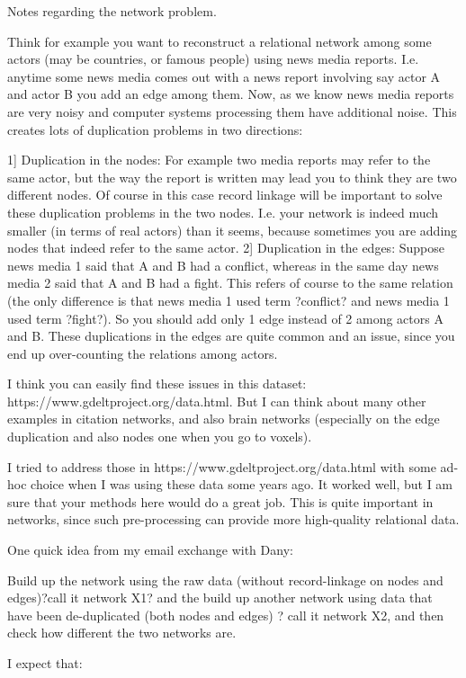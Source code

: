 \documentclass[twoside]{article}
\begin{document}
Notes regarding the network problem. 

Think for example you want to reconstruct a relational network among some actors (may be countries, or famous people) using news media reports.  I.e. anytime some news media comes out with a news report involving say actor A and actor B you add an edge among them. Now, as we know news media reports are very noisy and computer systems processing them have additional noise. This creates lots of duplication problems in two directions:

1] Duplication in the nodes: For example two media reports may refer to the same actor, but the way the report is written may lead you to think they are two different nodes. Of course in this case record linkage will be important to solve these duplication problems in the two nodes. I.e. your network is indeed much smaller (in terms of real actors) than it seems, because sometimes you are adding nodes that indeed refer to the same actor.
2] Duplication in the edges:  Suppose news media 1 said that A and B had a conflict, whereas in the same day news media 2 said that A and B had a fight. This refers of course to the same relation (the only difference is that news media 1 used term ?conflict? and news media 1 used term ?fight?). So you should add only 1 edge instead of 2 among actors A and B. These duplications in the edges are quite common and an issue, since you end up over-counting the relations among actors.

I think you can easily find these issues in this dataset: https://www.gdeltproject.org/data.html. But I can think about many other examples in citation networks, and also brain networks (especially on the edge duplication and also nodes one when you go to voxels).

I tried to address those in  https://www.gdeltproject.org/data.html with some ad-hoc choice when I was using these data some years ago. It worked well, but I am sure that your methods here would do a great job. This is quite important in networks, since such pre-processing can provide more high-quality relational data.

One quick idea from my email exchange with Dany:

Build up the network using the raw data (without record-linkage on nodes and edges)?call it network X1? and the build up another network using data that have been de-duplicated (both nodes and edges) ? call it network X2, and then check how different the two networks are. 

I expect that:
\end{document}
